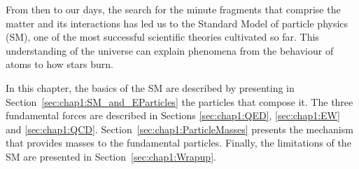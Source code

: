



From then to our days, the search for the minute fragments that comprise the matter and its interactions has led us to the
 Standard Model of particle physics (SM), one of the most successful scientific theories cultivated so far. This understanding
of the universe can explain phenomena from the behaviour of atoms to how stars burn. 



In this chapter, the basics of the SM are described by presenting 
in Section~\ref{sec:chap1:SM_and_EParticles} the particles that compose it. 
The three fundamental forces are described in Sections \ref{sec:chap1:QED}, \ref{sec:chap1:EW}
and \ref{sec:chap1:QCD}. Section~\ref{sec:chap1:ParticleMasses} presents the
mechanism that provides masses to the fundamental particles. 
Finally, the limitations of the SM are presented in Section~\ref{sec:chap1:Wrapup}.

